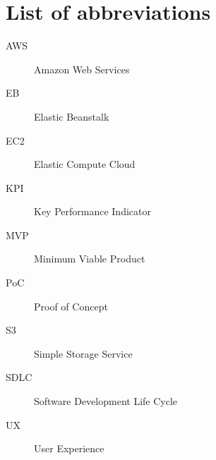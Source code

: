 \chapter{List of abbreviations}

\begin{description}
		\item[AWS] Amazon Web Services
		\item[EB] Elastic Beanstalk
		\item[EC2] Elastic Compute Cloud
		\item[KPI] Key Performance Indicator
		\item[MVP] Minimum Viable Product
		\item[PoC] Proof of Concept
		\item[S3] Simple Storage Service
		\item[SDLC] Software Development Life Cycle
		\item[UX] User Experience
\end{description}
	